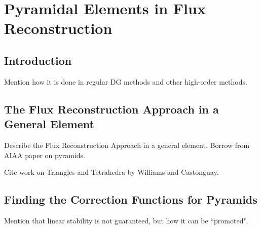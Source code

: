 \section{Pyramidal Elements in Flux Reconstruction}

\subsection{Introduction}
Mention how it is done in regular DG methods and other high-order methods.

\subsection{The Flux Reconstruction Approach in a General Element}
Describe the Flux Reconstruction Approach in a general element. Borrow from AIAA paper on pyramids.

Cite work on Triangles and Tetrahedra by Williams and Castonguay.

\subsection{Finding the Correction Functions for Pyramids}
Mention that linear stability is not guaranteed, but how it can be ``promoted".
